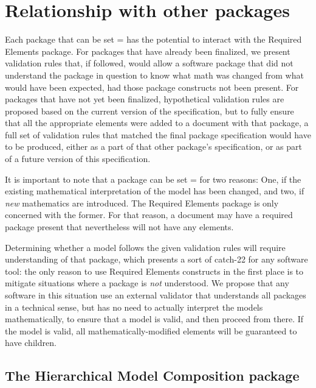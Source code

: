 
\section{Relationship with other packages}
\label{other-packages}

Each package that can be set = has the potential to interact with the Required Elements package.  For packages that have already been finalized, we present validation rules that, if followed, would allow a software package that did not understand the package in question to know what math was changed from what would have been expected, had those package constructs not been present.  For packages that have not yet been finalized, hypothetical validation rules are proposed based on the current version of the specification, but to fully ensure that all the appropriate \MathChanged elements were added to a document with that package, a full set of validation rules that matched the final package specification would have to be produced, either as a part of that other package's specification, or as part of a future version of this specification.

It is important to note that a package can be set = for two reasons:  One, if the existing mathematical interpretation of the model has been changed, and two, if \emph{new} mathematics are introduced.  The Required Elements package is only concerned with the former.  For that reason, a document may have a required package present that nevertheless will not have any \MathChanged elements.

Determining whether a model follows the given validation rules will require understanding of that package, which presents a sort of catch-22 for any software tool:  the only reason to use Required Elements constructs in the first place is to mitigate situations where a package is \emph{not} understood.  We propose that any software in this situation use an external validator that understands all packages in a technical sense, but has no need to actually interpret the models mathematically, to ensure that a model is valid, and then proceed from there.  If the model is valid, all mathematically-modified elements will be guaranteed to have \MathChanged children. 

\subsection{The Hierarchical Model Composition package}

